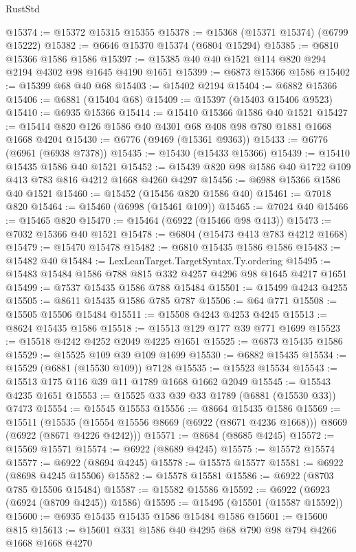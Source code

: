 \begin{lexlean}{RustStd}
\begin{coremodule}
@15374 := @15372 @15315 @15355
@15378 := @15368 (@15371 @15374) (@6799 @15222)
@15382 := @6646 @15370 @15374 (@6804 @15294)
@15385 := @6810 @15366 @1586 @1586
@15397 := @15385 @40 @40 @1521 @114 @820 @294 @2194 @4302 @98 @1645 @4190 @1651
@15399 := @6873 @15366 @1586
@15402 := @15399 @68 @40 @68
@15403 := @15402 @2194
@15404 := @6882 @15366
@15406 := @6881 (@15404 @68)
@15409 := @15397 (@15403 @15406 @9523)
@15410 := @6935 @15366
@15414 := @15410 @15366 @1586 @40 @1521
@15427 := @15414 @820 @126 @1586 @40 @4301 @68 @408 @98 @780 @1881 @1668 @1668 @4204
@15430 := @6776 (@9469 (@15361 @9363))
@15433 := @6776 (@6961 (@6938 @7378))
@15435 := @15430 (@15433 @15366)
@15439 := @15410 @15435 @1586 @40 @1521
@15452 := @15439 @820 @98 @1586 @40 @1722 @109 @413 @783 @816 @4212 @1668 @4260 @4297
@15456 := @6988 @15366 @1586 @40 @1521
@15460 := @15452 (@15456 @820 @1586 @40)
@15461 := @7018 @820
@15464 := @15460 (@6998 (@15461 @109))
@15465 := @7024 @40
@15466 := @15465 @820
@15470 := @15464 (@6922 (@15466 @98 @413))
@15473 := @7032 @15366 @40 @1521
@15478 := @6804 (@15473 @413 @783 @4212 @1668)
@15479 := @15470 @15478
@15482 := @6810 @15435 @1586 @1586
@15483 := @15482 @40
@15484 := LexLeanTarget.TargetSyntax.Ty.ordering
@15495 := @15483 @15484 @1586 @788 @815 @332 @4257 @4296 @98 @1645 @4217 @1651
@15499 := @7537 @15435 @1586 @788 @15484
@15501 := @15499 @4243 @4255
@15505 := @8611 @15435 @1586 @785 @787
@15506 := @64 @771
@15508 := @15505 @15506 @15484
@15511 := @15508 @4243 @4253 @4245
@15513 := @8624 @15435 @1586
@15518 := @15513 @129 @177 @39 @771 @1699
@15523 := @15518 @4242 @4252 @2049 @4225 @1651
@15525 := @6873 @15435 @1586
@15529 := @15525 @109 @39 @109 @1699
@15530 := @6882 @15435
@15534 := @15529 (@6881 (@15530 @109)) @7128
@15535 := @15523 @15534
@15543 := @15513 @175 @116 @39 @11 @1789 @1668 @1662 @2049
@15545 := @15543 @4235 @1651
@15553 := @15525 @33 @39 @33 @1789 (@6881 (@15530 @33)) @7473
@15554 := @15545 @15553
@15556 := @8664 @15435 @1586
@15569 := @15511
    (@15535 (@15554 @15556 @8669 (@6922 (@8671 @4236 @1668))) @8669 (@6922 (@8671 @4226 @4242)))
@15571 := @8684 (@8685 @4245)
@15572 := @15569 @15571
@15574 := @6922 (@8689 @4245)
@15575 := @15572 @15574
@15577 := @6922 (@8694 @4245)
@15578 := @15575 @15577
@15581 := @6922 (@8698 @4245 @15506)
@15582 := @15578 @15581
@15586 := @6922 (@8703 @785 @15506 @15484)
@15587 := @15582 @15586
@15592 := @6922 (@6923 (@6924 (@8709 @4245)) @1586)
@15595 := @15495 (@15501 (@15587 @15592))
@15600 := @6935 @15435 @15435 @1586 @15484 @1586
@15601 := @15600 @815
@15613 := @15601 @331 @1586 @40 @4295 @68 @790 @98 @794 @4266 @1668 @1668 @4270

\end{coremodule}
\end{lexlean}
